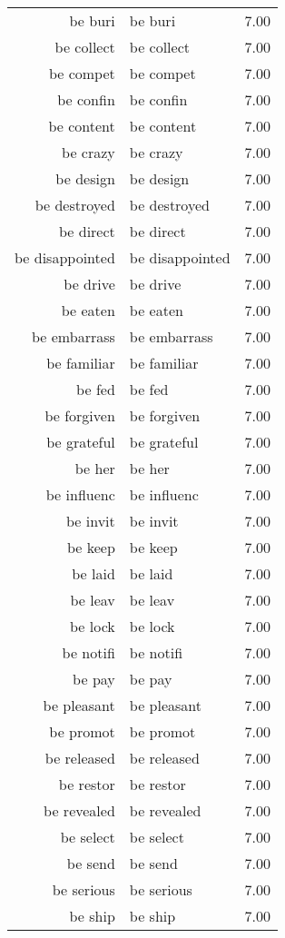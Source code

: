 \begin{table}[ht]
\begin{tabular}{rlr}
  be buri & be buri & 7.00 \\ 
  be collect & be collect & 7.00 \\ 
  be compet & be compet & 7.00 \\ 
  be confin & be confin & 7.00 \\ 
  be content & be content & 7.00 \\ 
  be crazy & be crazy & 7.00 \\ 
  be design & be design & 7.00 \\ 
  be destroyed & be destroyed & 7.00 \\ 
  be direct & be direct & 7.00 \\ 
  be disappointed & be disappointed & 7.00 \\ 
  be drive & be drive & 7.00 \\ 
  be eaten & be eaten & 7.00 \\ 
  be embarrass & be embarrass & 7.00 \\ 
  be familiar & be familiar & 7.00 \\ 
  be fed & be fed & 7.00 \\ 
  be forgiven & be forgiven & 7.00 \\ 
  be grateful & be grateful & 7.00 \\ 
  be her & be her & 7.00 \\ 
  be influenc & be influenc & 7.00 \\ 
  be invit & be invit & 7.00 \\ 
  be keep & be keep & 7.00 \\ 
  be laid & be laid & 7.00 \\ 
  be leav & be leav & 7.00 \\ 
  be lock & be lock & 7.00 \\ 
  be notifi & be notifi & 7.00 \\ 
  be pay & be pay & 7.00 \\ 
  be pleasant & be pleasant & 7.00 \\ 
  be promot & be promot & 7.00 \\ 
  be released & be released & 7.00 \\ 
  be restor & be restor & 7.00 \\ 
  be revealed & be revealed & 7.00 \\ 
  be select & be select & 7.00 \\ 
  be send & be send & 7.00 \\ 
  be serious & be serious & 7.00 \\ 
  be ship & be ship & 7.00 \\ 

\end{tabular}
\end{table}
